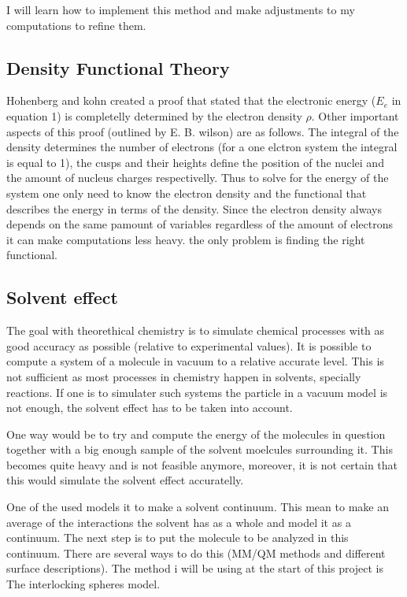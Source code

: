 \documentclass[a4paper,11pt]{article}
\begin{document}
I will learn how to implement this method and make adjustments to my computations to refine them.

\subsection{Density Functional Theory}

Hohenberg and kohn %
created a proof that stated that the electronic energy ($E_e$ in equation 1) is completelly determined by the electron density $\rho$. Other important aspects of this proof (outlined by E. B. wilson)%
are as follows. The integral of the density determines the number of electrons (for a one elctron system the integral is equal to 1), the cusps and their heights define the position of the nuclei and the amount of nucleus charges respectivelly.
Thus to solve for the energy of the system one only need to know the electron density and the functional that describes the energy in terms of the density. Since the electron density always depends on the same pamount of variables regardless of the amount of electrons it can make computations less heavy. the only problem is finding the right functional.

 

\subsection{Solvent effect}

The goal with theorethical chemistry is to simulate chemical processes with as good accuracy as possible (relative to experimental values). It is possible to compute a system of a molecule in vacuum to a relative accurate level. This is not sufficient as most processes in chemistry happen in solvents, specially reactions. If one is to simulater such systems the particle in a vacuum model is not enough, the solvent effect has to be taken into account.

One way would be to try and compute the energy of the molecules in question together with a big enough sample of the solvent moelcules surrounding it. This becomes quite heavy and is not feasible anymore, moreover, it is not certain that this would simulate the solvent effect accuratelly.

One of the used models it to make a solvent continuum. This mean to make an average of the interactions the solvent has as a whole and model it as a continuum. The next step is to put the molecule to be analyzed in this continuum. There are several ways to do this (MM/QM methods and different surface descriptions). The method i will be using at the start of this project is The interlocking spheres model.
\end{document}
